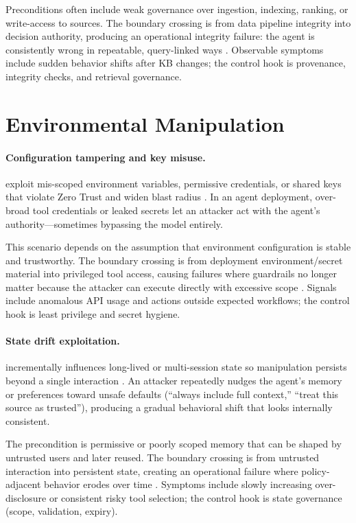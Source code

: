 \begin{TNtwocol}
  Preconditions often include weak governance over ingestion, indexing, ranking, or write-access to sources. The boundary crossing is from data pipeline integrity into decision authority, producing an operational integrity failure: the agent is consistently wrong in repeatable, query-linked ways \cite{owasp-top10-llm-2025,nist-genai-600-1}. Observable symptoms include sudden behavior shifts after KB changes; the control hook is provenance, integrity checks, and retrieval governance.

  \section{Environmental Manipulation}

  \paragraph{Configuration tampering and key misuse.} exploit mis-scoped environment variables, permissive credentials, or shared keys that violate Zero Trust and widen blast radius \cite{nist-sp800-207,cisa-ztmm-v2}. In an agent deployment, over-broad tool credentials or leaked secrets let an attacker act with the agent's authority—sometimes bypassing the model entirely.

  This scenario depends on the assumption that environment configuration is stable and trustworthy. The boundary crossing is from deployment environment/secret material into privileged tool access, causing failures where guardrails no longer matter because the attacker can execute directly with excessive scope \cite{nist-sp800-207,cisa-ztmm-v2}. Signals include anomalous API usage and actions outside expected workflows; the control hook is least privilege and secret hygiene.

  \paragraph{State drift exploitation.} incrementally influences long-lived or multi-session state so manipulation persists beyond a single interaction \cite{owasp-prompt-injection-cheatsheet,owasp-top10-llm-2025}. An attacker repeatedly nudges the agent's memory or preferences toward unsafe defaults (“always include full context,” “treat this source as trusted”), producing a gradual behavioral shift that looks internally consistent.

  The precondition is permissive or poorly scoped memory that can be shaped by untrusted users and later reused. The boundary crossing is from untrusted interaction into persistent state, creating an operational failure where policy-adjacent behavior erodes over time \cite{owasp-prompt-injection-cheatsheet,owasp-top10-llm-2025}. Symptoms include slowly increasing over-disclosure or consistent risky tool selection; the control hook is state governance (scope, validation, expiry).


\end{TNtwocol}

